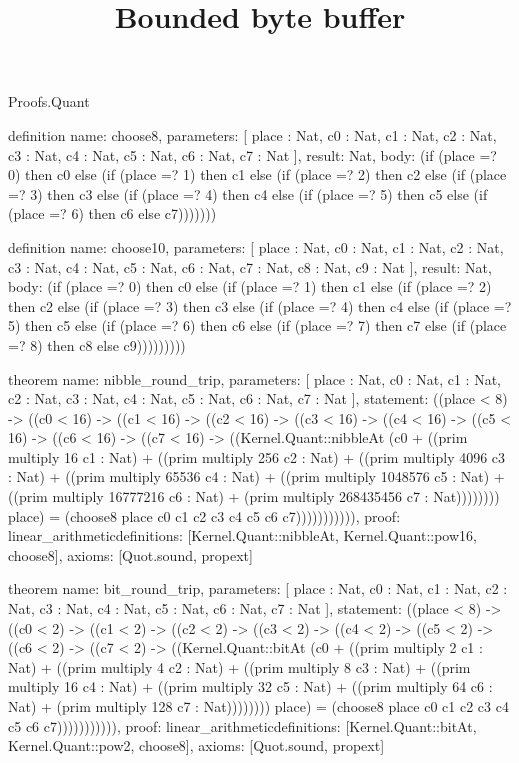 \begin{lexlean}{Proofs.Quant}
\title{Bounded byte buffer}
\begin{semanticmodule}
definition{
  name: choose8,
  parameters: [
    place : Nat,
    c0 : Nat,
    c1 : Nat,
    c2 : Nat,
    c3 : Nat,
    c4 : Nat,
    c5 : Nat,
    c6 : Nat,
    c7 : Nat
  ],
  result: Nat,
  body: (if (place =? 0) then c0 else (if (place =? 1) then c1 else (if (place =? 2) then c2 else (if (place =? 3) then c3 else (if (place =? 4) then c4 else (if (place =? 5) then c5 else (if (place =? 6) then c6 else c7)))))))
}

definition{
  name: choose10,
  parameters: [
    place : Nat,
    c0 : Nat,
    c1 : Nat,
    c2 : Nat,
    c3 : Nat,
    c4 : Nat,
    c5 : Nat,
    c6 : Nat,
    c7 : Nat,
    c8 : Nat,
    c9 : Nat
  ],
  result: Nat,
  body: (if (place =? 0) then c0 else (if (place =? 1) then c1 else (if (place =? 2) then c2 else (if (place =? 3) then c3 else (if (place =? 4) then c4 else (if (place =? 5) then c5 else (if (place =? 6) then c6 else (if (place =? 7) then c7 else (if (place =? 8) then c8 else c9)))))))))
}

theorem{
  name: nibble_round_trip,
  parameters: [
    place : Nat,
    c0 : Nat,
    c1 : Nat,
    c2 : Nat,
    c3 : Nat,
    c4 : Nat,
    c5 : Nat,
    c6 : Nat,
    c7 : Nat
  ],
  statement: ((place < 8) -> ((c0 < 16) -> ((c1 < 16) -> ((c2 < 16) -> ((c3 < 16) -> ((c4 < 16) -> ((c5 < 16) -> ((c6 < 16) -> ((c7 < 16) -> ((Kernel.Quant::nibbleAt (c0 + ((prim multiply 16 c1 : Nat) + ((prim multiply 256 c2 : Nat) + ((prim multiply 4096 c3 : Nat) + ((prim multiply 65536 c4 : Nat) + ((prim multiply 1048576 c5 : Nat) + ((prim multiply 16777216 c6 : Nat) + (prim multiply 268435456 c7 : Nat)))))))) place) = (choose8 place c0 c1 c2 c3 c4 c5 c6 c7))))))))))),
  proof: linear_arithmetic{definitions: [Kernel.Quant::nibbleAt, Kernel.Quant::pow16, choose8]},
  axioms: [Quot.sound, propext]
}

theorem{
  name: bit_round_trip,
  parameters: [
    place : Nat,
    c0 : Nat,
    c1 : Nat,
    c2 : Nat,
    c3 : Nat,
    c4 : Nat,
    c5 : Nat,
    c6 : Nat,
    c7 : Nat
  ],
  statement: ((place < 8) -> ((c0 < 2) -> ((c1 < 2) -> ((c2 < 2) -> ((c3 < 2) -> ((c4 < 2) -> ((c5 < 2) -> ((c6 < 2) -> ((c7 < 2) -> ((Kernel.Quant::bitAt (c0 + ((prim multiply 2 c1 : Nat) + ((prim multiply 4 c2 : Nat) + ((prim multiply 8 c3 : Nat) + ((prim multiply 16 c4 : Nat) + ((prim multiply 32 c5 : Nat) + ((prim multiply 64 c6 : Nat) + (prim multiply 128 c7 : Nat)))))))) place) = (choose8 place c0 c1 c2 c3 c4 c5 c6 c7))))))))))),
  proof: linear_arithmetic{definitions: [Kernel.Quant::bitAt, Kernel.Quant::pow2, choose8]},
  axioms: [Quot.sound, propext]
}


\end{semanticmodule}
\end{lexlean}
